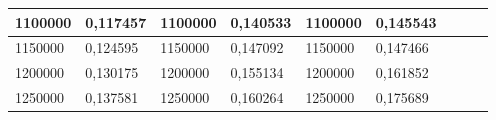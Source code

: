 \documentclass[11pt,openany]{book}
\begin{document}
\begin{table}[!ht]
\begin{tabular}{|l|l|l|l|l|l|l|l|}
        1100000                                           & 0,117457                                           & 1100000                                             & 0,140533                                            & 1100000         & 0,145543        & ~               & ~               \\ \hline
        1150000                                           & 0,124595                                           & 1150000                                             & 0,147092                                            & 1150000         & 0,147466        & ~               & ~               \\ \hline
        1200000                                           & 0,130175                                           & 1200000                                             & 0,155134                                            & 1200000         & 0,161852        & ~               & ~               \\ \hline
        1250000                                           & 0,137581                                           & 1250000                                             & 0,160264                                            & 1250000         & 0,175689        & ~               &                 \\\hline
    \end{tabular}
\end{table}
\end{document}
